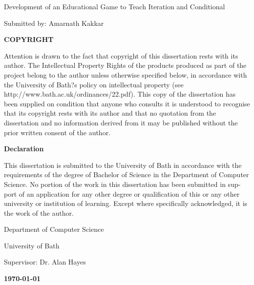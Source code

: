 \documentclass[a4paper,11.5pt]{report}
\numberwithin{figure}{section}
\numberwithin{table}{section}
\numberwithin{equation}{section}
\numberwithin{equation}{section}
\begin{document}
\newpage



    
\clearpage\thispagestyle{empty}
\begin{center}
\begin{minipage}{1\linewidth}
    \vspace{2cm}
    {\LARGE Development of an Educational Game to Teach Iteration and Conditional \par}
    \vspace{1cm}	
    {\large Submitted by: Amarnath Kakkar\par}
	
    \vspace{1.5cm}
    {\Large \textbf{COPYRIGHT}\par}
    \vspace{0.5cm}
    {Attention is drawn to the fact that copyright of this dissertation rests with its author. The Intellectual Property Rights of the products produced as part of the project belong to the author unless otherwise specified below, in accordance with the University of Bath?s policy on intellectual property
(see http://www.bath.ac.uk/ordinances/22.pdf).
This copy of the dissertation has been supplied on condition that anyone who consults it is understood to recognise that its copyright rests with its author and that no quotation from the dissertation and no information derived from it may be published without the prior written consent of the author.\par}

     \vspace{0.5cm}
     {\Large \textbf{Declaration}\par}
      \vspace{0.5cm}
      {This dissertation is submitted to the University of Bath in accordance with the requirements of the degree of Bachelor of Science in the Department of Computer Science. No portion of the work in this dissertation has been submitted in sup- port of an application for any other degree or qualification of this or any other university or institution of learning. Except where specifically acknowledged, it is the work of the author.\par}
    
     \vspace{2.5cm}
    {\large Department of Computer Science\par}
    {\large University of Bath\par}
    \vspace{0.5cm}
    {\large Supervisor: Dr. Alan Hayes}\par
    {\large \textbf{\monthyeardate\today}\par}
    \vspace{1cm}
\end{minipage}
\end{center}
\end{document}
